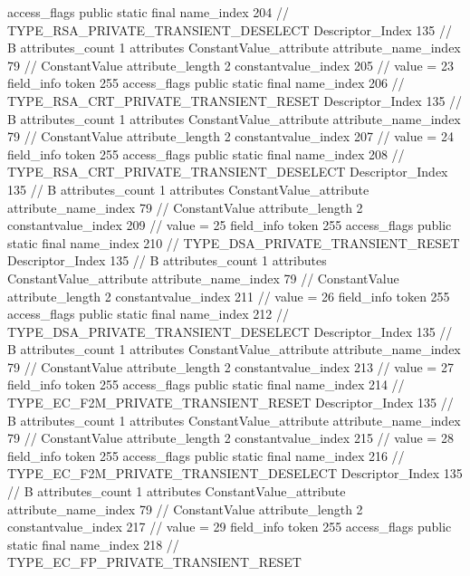 {{{{{				access_flags	public static final
				name_index	204		// TYPE_RSA_PRIVATE_TRANSIENT_DESELECT
				Descriptor_Index	135		// B
				attributes_count	1
				attributes {
				ConstantValue_attribute {
					attribute_name_index	79		// ConstantValue
					attribute_length	2
					constantvalue_index	205		// value = 23
				}
				}
			}
			field_info {
				token	255
				access_flags	public static final
				name_index	206		// TYPE_RSA_CRT_PRIVATE_TRANSIENT_RESET
				Descriptor_Index	135		// B
				attributes_count	1
				attributes {
				ConstantValue_attribute {
					attribute_name_index	79		// ConstantValue
					attribute_length	2
					constantvalue_index	207		// value = 24
				}
				}
			}
			field_info {
				token	255
				access_flags	public static final
				name_index	208		// TYPE_RSA_CRT_PRIVATE_TRANSIENT_DESELECT
				Descriptor_Index	135		// B
				attributes_count	1
				attributes {
				ConstantValue_attribute {
					attribute_name_index	79		// ConstantValue
					attribute_length	2
					constantvalue_index	209		// value = 25
				}
				}
			}
			field_info {
				token	255
				access_flags	public static final
				name_index	210		// TYPE_DSA_PRIVATE_TRANSIENT_RESET
				Descriptor_Index	135		// B
				attributes_count	1
				attributes {
				ConstantValue_attribute {
					attribute_name_index	79		// ConstantValue
					attribute_length	2
					constantvalue_index	211		// value = 26
				}
				}
			}
			field_info {
				token	255
				access_flags	public static final
				name_index	212		// TYPE_DSA_PRIVATE_TRANSIENT_DESELECT
				Descriptor_Index	135		// B
				attributes_count	1
				attributes {
				ConstantValue_attribute {
					attribute_name_index	79		// ConstantValue
					attribute_length	2
					constantvalue_index	213		// value = 27
				}
				}
			}
			field_info {
				token	255
				access_flags	public static final
				name_index	214		// TYPE_EC_F2M_PRIVATE_TRANSIENT_RESET
				Descriptor_Index	135		// B
				attributes_count	1
				attributes {
				ConstantValue_attribute {
					attribute_name_index	79		// ConstantValue
					attribute_length	2
					constantvalue_index	215		// value = 28
				}
				}
			}
			field_info {
				token	255
				access_flags	public static final
				name_index	216		// TYPE_EC_F2M_PRIVATE_TRANSIENT_DESELECT
				Descriptor_Index	135		// B
				attributes_count	1
				attributes {
				ConstantValue_attribute {
					attribute_name_index	79		// ConstantValue
					attribute_length	2
					constantvalue_index	217		// value = 29
				}
				}
			}
			field_info {
				token	255
				access_flags	public static final
				name_index	218		// TYPE_EC_FP_PRIVATE_TRANSIENT_RESET
}}}}}
